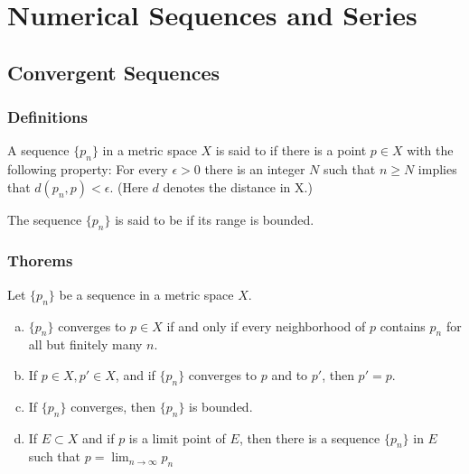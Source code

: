 \chapter{Numerical Sequences and Series}

\section{Convergent Sequences}
\subsection{Definitions}
\begin{definition}
	A sequence $\{p_n\}$ in a metric space $X$ is said to {}  if there is a point $p \in X$ with the following property: For every $\epsilon > 0$ there is an integer $N$ such that $n \ge N$ implies that $d(p_n,p) < \epsilon$. (Here $d$ denotes the distance in X.)	
\end{definition}

\begin{definition}
	The sequence $\{p_n\}$ is said to be {} if its range is bounded.
\end{definition}

\subsection{Thorems}
\begin{theorem}\label{theo:convergent seq}
	Let $\{p_n\}$ be a sequence in a metric space $X$.
	\begin{enumerate}[(a)]
		\item $\{p_n\}$ converges to $p \in X$ if and only if every neighborhood of $p$ contains $p_n$ for all but finitely many $n$.
		\item If $p \in X, p' \in X$, and if $\{p_n\}$ converges to $p$ and to $p'$, then $p'=p$.
		\item If $\{p_n\}$ converges, then $\{p_n\}$ is bounded.
		\item If $E \subset X$ and if $p$ is a limit point  of $E$, then there is a sequence $\{p_n\}$ in $E$ such that $p = \lim_{n \to \infty} p_n$
	\end{enumerate}
\end{theorem}

